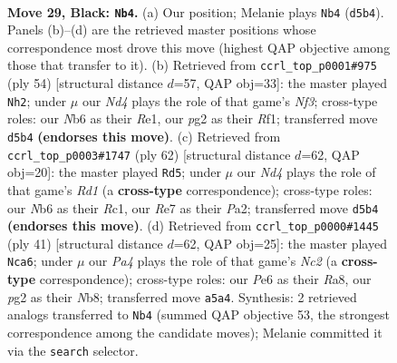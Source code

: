 \documentclass[11pt]{article}
\begin{document}
\clearpage

\begin{figure}[p]\centering
\begin{subfigure}{0.46\textwidth}\centering
\resizebox{\linewidth}{!}{%
\newchessgame
\chessboard[
  setfen={r5k1/4rppp/1n2p3/pb1n2P1/4N3/1P2P2R/P5PP/RN1B2K1 b - - 8 29},
  showmover=false,
  pgfstyle=straightmove, color=movearrow, markmove={d5-b4}
]}
\caption{}
\end{subfigure}\hfill
\begin{subfigure}{0.46\textwidth}\centering
\resizebox{\linewidth}{!}{%
\newchessgame
\chessboard[
  setfen={1k1r4/pp4p1/3n1pn1/3p3r/P2P3p/1PN2N1P/2PK2P1/4RR2 w - - 5 28},
  showmover=false,
  pgfstyle=straightmove, color=movearrow, markmove={f3-h2}
]}
\caption{}
\end{subfigure}
\\[4pt]
\begin{subfigure}{0.46\textwidth}\centering
\resizebox{\linewidth}{!}{%
\newchessgame
\chessboard[
  setfen={2r2bk1/6pp/p2n3r/1p5P/2p2N2/2N1PK2/PP3P2/2RR4 w - - 0 32},
  showmover=false,
  pgfstyle=straightmove, color=movearrow, markmove={d1-d5}
]}
\caption{}
\end{subfigure}\hfill
\begin{subfigure}{0.46\textwidth}\centering
\resizebox{\linewidth}{!}{%
\newchessgame
\chessboard[
  setfen={rn3rk1/2np2pp/4p3/p3P3/NbP5/5NP1/PB4KP/R2R4 b - - 1 21},
  showmover=false,
  pgfstyle=straightmove, color=movearrow, markmove={c7-a6}
]}
\caption{}
\end{subfigure}
\caption{\textbf{Move 29, Black: \texttt{Nb4}.} (a) Our position; Melanie plays \texttt{Nb4} (\texttt{d5b4}). Panels (b)--(d) are the retrieved master positions whose correspondence most drove this move (highest QAP objective among those that transfer to it). (b) Retrieved from \texttt{ccrl\_top\_p0001\#975} (ply 54) [structural distance $d$=57, QAP obj=33]: the master played \texttt{Nh2}; under $\mu$ our \emph{Nd4} plays the role of that game's \emph{Nf3}; cross-type roles: our \emph{N}b6 as their \emph{R}e1, our \emph{p}g2 as their \emph{R}f1; transferred move \texttt{d5b4} \textbf{(endorses this move)}. (c) Retrieved from \texttt{ccrl\_top\_p0003\#1747} (ply 62) [structural distance $d$=62, QAP obj=20]: the master played \texttt{Rd5}; under $\mu$ our \emph{Nd4} plays the role of that game's \emph{Rd1} (a \textbf{cross-type} correspondence); cross-type roles: our \emph{N}b6 as their \emph{R}c1, our \emph{R}e7 as their \emph{P}a2; transferred move \texttt{d5b4} \textbf{(endorses this move)}. (d) Retrieved from \texttt{ccrl\_top\_p0000\#1445} (ply 41) [structural distance $d$=62, QAP obj=25]: the master played \texttt{Nca6}; under $\mu$ our \emph{Pa4} plays the role of that game's \emph{Nc2} (a \textbf{cross-type} correspondence); cross-type roles: our \emph{P}e6 as their \emph{R}a8, our \emph{p}g2 as their \emph{N}b8; transferred move \texttt{a5a4}. Synthesis: 2 retrieved analogs transferred to \texttt{Nb4} (summed QAP objective 53, the strongest correspondence among the candidate moves); Melanie committed it via the \texttt{search} selector.}
\label{fig:thought-m57}
\end{figure}
\end{document}
